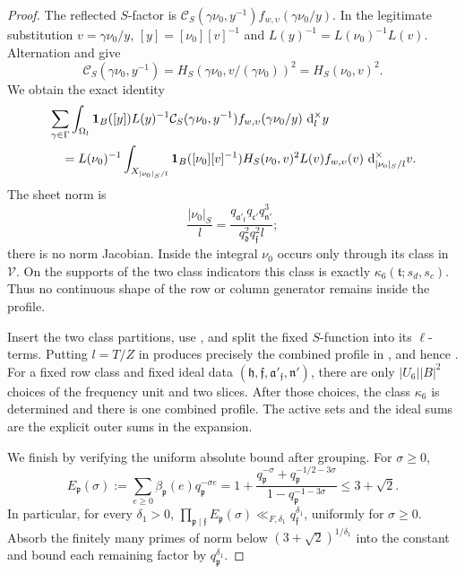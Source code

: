 \begin{proof}
The reflected \(S\)-factor is
\(\mathcal C_S(\gamma\nu_0,y^{-1})f_{w,\upsilon}(\gamma\nu_0/y)\).
In the legitimate substitution \(v=\gamma\nu_0/y\),
\([y]=[\nu_0][v]^{-1}\) and
\(L(y)^{-1}=L(\nu_0)^{-1}L(v)\).  Alternation and
 give
\[
 \mathcal C_S(\gamma\nu_0,y^{-1})
   =H_S(\gamma\nu_0,v/(\gamma\nu_0))^2
   =H_S(\nu_0,v)^2.
\]
We obtain the exact identity
\begin{equation}\label{eq:reflection-S-unfolding}
\begin{split}
 &\sum_{\gamma\in\Gamma}\int_{\Omega_l}
   \mathbf{1}_B([y])L(y)^{-1}\mathcal C_S(\gamma\nu_0,y^{-1})
       f_{w,\upsilon}(\gamma\nu_0/y)\,\,\mathrm{d}_l^\times y\\
 &\quad=L(\nu_0)^{-1}\int_{X_{|\nu_0|_S/l}}
   \mathbf{1}_B([\nu_0][v]^{-1})H_S(\nu_0,v)^2L(v)f_{w,\upsilon}(v)
       \,\,\mathrm{d}_{|\nu_0|_S/l}^\times v .
\end{split}
\end{equation}
The sheet norm is
\[
 \frac{|\nu_0|_S}{l}
   =\frac{q_{\mathfrak a'_{\mathfrak f}}q_{\mathfrak c'}q_{\mathfrak n'}^3}
          {q_{\mathfrak d}^2q_{\mathfrak f}^2l};
\]
there is no norm Jacobian.  Inside the integral \(\nu_0\) occurs only
through its class in \(\mathcal V\).  On the supports of the two class
indicators this class is exactly
\(\kappa_6(\mathfrak t;s_d,s_c)\).  Thus no continuous shape of the row
or column generator remains inside the profile.

Insert the two class partitions, use
, and split the fixed \(S\)-function
into its \(\ell\)-terms.  Putting \(l=T/Z\) in
 produces precisely the combined profile
in , and hence
.  For a fixed row class and fixed
ideal data \((\mathfrak h,\mathfrak f,\mathfrak a'_{\mathfrak f},\mathfrak n')\),
there are only \(|U_6||B|^2\) choices of the frequency unit and two slices.
After those choices, the class
\(\kappa_6\) is determined and there is one combined profile.  The active
sets and the ideal sums are the explicit outer sums in the expansion.

We finish by verifying the uniform absolute bound after grouping.  For
\(\sigma\ge0\),
\begin{equation}\label{eq:reflection-frozen-Dirichlet}
 E_{\mathfrak p}(\sigma)
 :=\sum_{e\ge0}\beta_{\mathfrak p}(e)q_{\mathfrak p}^{-\sigma e}
 =1+\frac{q_{\mathfrak p}^{-\sigma}
             +q_{\mathfrak p}^{-1/2-3\sigma}}
            {1-q_{\mathfrak p}^{-1-3\sigma}}
 \le 3+\sqrt2.
\end{equation}
In particular, for every \(\delta_1>0\),
\(\prod_{\mathfrak p\mid\mathfrak f}E_{\mathfrak p}(\sigma)
 \ll_{F,\delta_1}q_{\mathfrak f}^{\delta_1}\), uniformly for
\(\sigma\ge0\).  Absorb the finitely many primes of norm below
\((3+\sqrt2)^{1/\delta_1}\) into the constant and bound each remaining
factor by \(q_{\mathfrak p}^{\delta_1}\).


\end{proof}

